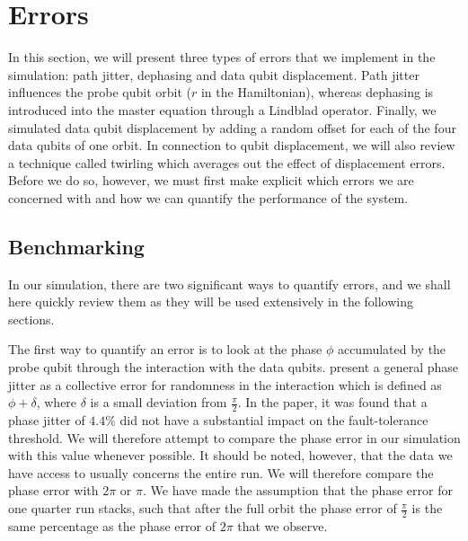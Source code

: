 \section{Errors} \label{sec:errors}
In this section, we will present three types of errors that we implement in the simulation: path jitter, dephasing and data qubit displacement. Path jitter influences the probe qubit orbit ($r$ in the Hamiltonian), whereas dephasing is introduced into the master equation through a Lindblad operator. Finally, we simulated data qubit displacement by adding a random offset for each of the four data qubits of one orbit. In connection to qubit displacement, we will also review a technique called twirling which averages out the effect of displacement errors. Before we do so, however, we must first make explicit which errors we are concerned with and how we can quantify the performance of the system. 


\subsection{Benchmarking}
In our simulation, there are two significant ways to quantify errors, and we shall here quickly review them as they will be used extensively in the following sections.

The first way to quantify an error is to look at the phase $\phi$ accumulated by the probe qubit through the interaction with the data qubits. \citet{OGorman2016} present a general phase jitter as a collective error for randomness in the interaction which is defined as $\phi + \delta$, where $\delta$ is a small deviation from $\frac{\pi}{2}$.  In the paper, it was found that a phase jitter of $4.4 \%$ did not have a substantial impact on the fault-tolerance threshold. We will therefore attempt to compare the phase error in our simulation with this value whenever possible. It should be noted, however, that the data we have access to usually concerns the entire run. We will therefore compare the phase error with $2\pi$ or $\pi$. We have made the assumption that the phase error for one quarter run stacks, such that after the full orbit the phase error of $\frac{\pi}{2}$ is the same percentage as the phase error of $2\pi$ that we observe. 

